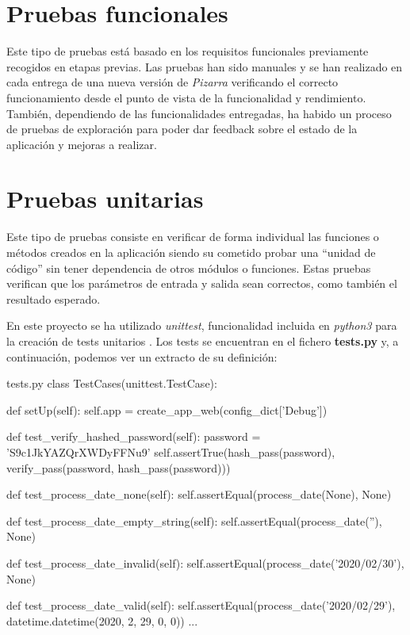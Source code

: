 \documentclass[11pt,spanish,listoffigures,listoftables]{tfgetsinf}
\begin{document}
\section{Pruebas funcionales}

Este tipo de pruebas está basado en los requisitos funcionales previamente recogidos en etapas previas. Las pruebas han sido manuales y se han realizado en cada entrega de una nueva versión de \textit{Pizarra} verificando el correcto funcionamiento desde el punto de vista de la funcionalidad y rendimiento. También, dependiendo de las funcionalidades entregadas, ha habido un proceso de pruebas de exploración para poder dar feedback sobre el estado de la aplicación y mejoras a realizar.

\section{Pruebas unitarias}

Este tipo de pruebas consiste en verificar de forma individual las funciones o métodos creados en la aplicación siendo su cometido probar una ``unidad de código'' sin tener dependencia de otros módulos o funciones. Estas pruebas verifican que los parámetros de entrada y salida sean correctos, como también el resultado esperado.

En este proyecto se ha utilizado \textit{unittest}, funcionalidad incluida en \textit{python3} para la creación de tests unitarios \cite{book-python-testing}. Los tests se encuentran en el fichero \textbf{tests.py} y, a continuación, podemos ver un extracto de su definición: \newline

\begin{code}{tests.py}
class TestCases(unittest.TestCase):

	def setUp(self):
		self.app = create_app_web(config_dict['Debug'])
	
	def test_verify_hashed_password(self):
		password = 'S9c1JkYAZQrXWDyFFNu9'
		self.assertTrue(hash_pass(password), verify_pass(password, hash_pass(password)))
		
	def test_process_date_none(self):
		self.assertEqual(process_date(None), None)
	
	def test_process_date_empty_string(self):
		self.assertEqual(process_date(''), None)
	
	def test_process_date_invalid(self):
		self.assertEqual(process_date('2020/02/30'), None)
	
	def test_process_date_valid(self):
		self.assertEqual(process_date('2020/02/29'), datetime.datetime(2020, 2, 29, 0, 0))
...
\end{code}
\end{document}

